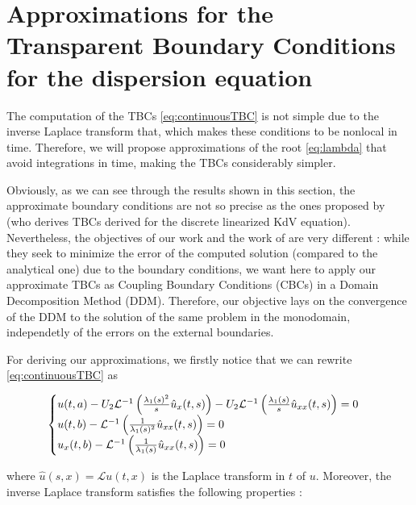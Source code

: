 \section{Approximations for the Transparent Boundary Conditions for the dispersion equation}
\label{sec:TBC}

\indent The computation of the TBCs \eqref{eq:continuousTBC} is not simple due to the inverse Laplace transform that, which makes these conditions to be nonlocal in time. Therefore, we will propose approximations of the root \eqref{eq:lambda} that avoid integrations in time, making the TBCs considerably simpler.

\indent Obviously, as we can see through the results shown in this section, the approximate boundary conditions are not so precise as the ones proposed by \cite{besse2015} (who derives TBCs derived for the discrete linearized KdV equation). Nevertheless, the objectives of our work and the work of \cite{besse2015} are very different : while they seek to minimize the error of the computed solution (compared to the analytical one) due to the boundary conditions, we want here to apply our approximate TBCs as Coupling Boundary Conditions (CBCs) in a Domain Decomposition Method (DDM). Therefore, our objective lays on the convergence of the DDM to the solution of the same problem in the monodomain, independetly of the errors on the external boundaries. 

\indent For deriving our approximations, we firstly notice that we can rewrite \eqref{eq:continuousTBC} as

\begin{gather}
\label{eq:TBCnoConvolution}
    \begin{cases}
        u(t,a) - U_2 \mathcal{L}^{-1} \left( \frac{\lambda_1(s)^2}{s} \hat{u}_x(t,s) \right)  - U_2 \mathcal{L}^{-1} \left( \frac{\lambda_1(s)}{s}  \hat{u}_{xx}(t,s) \right) = 0 \\
        u(t,b) - \mathcal{L}^{-1} \left( \frac{1}{\lambda_1(s)^2}   \hat{u}_{xx}(t,s) \right) = 0 \\
        u_x(t,b) - \mathcal{L}^{-1} \left( \frac{1}{\lambda_1(s)}   \hat{u}_{xx}(t,s) \right) = 0 
    \end{cases}
\end{gather}

\noindent where $\hat{u}(s,x) = \mathcal{L}u(t,x)$ is the Laplace transform in $t$ of $u$.  Moreover, the inverse Laplace transform satisfies the following properties \cite{laplaceTransform}:

